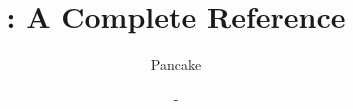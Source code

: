 \documentclass[12pt, a4paper, openright]{memoir}
\begin{document}
\title{\langname : A Complete Reference}
\author{Pancake}
\date{ - \DTMtoday}
\frontmatter
\begin{titlingpage}
  \maketitle
\end{titlingpage}

\begin{KeepFromToc}
  \tableofcontents
\end{KeepFromToc}
\mainmatter




\backmatter
\end{document}
